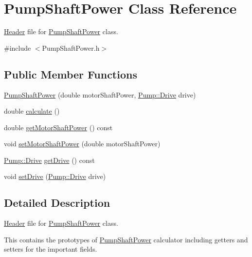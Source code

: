 \hypertarget{class_pump_shaft_power}{}\section{Pump\+Shaft\+Power Class Reference}
\label{class_pump_shaft_power}


\hyperlink{class_header}{Header} file for \hyperlink{class_pump_shaft_power}{Pump\+Shaft\+Power} class.  




{\ttfamily \#include $<$Pump\+Shaft\+Power.\+h$>$}

\subsection*{Public Member Functions}
\begin{DoxyCompactItemize}
\item 
\hyperlink{class_pump_shaft_power_a84d04978ce410d544a4c8d9eb393c92d}{Pump\+Shaft\+Power} (double motor\+Shaft\+Power, \hyperlink{class_pump_a32bf0ade131a11bb3b3fb374f638e983}{Pump\+::\+Drive} drive)
\item 
double \hyperlink{class_pump_shaft_power_aad32bf26469a5f2984c85ba07c3f84d9}{calculate} ()
\item 
double \hyperlink{class_pump_shaft_power_acb91eadb960f946ffee5373d4839a5be}{get\+Motor\+Shaft\+Power} () const
\item 
void \hyperlink{class_pump_shaft_power_a77b8c621c7c92841dbd00112437c413b}{set\+Motor\+Shaft\+Power} (double motor\+Shaft\+Power)
\item 
\hyperlink{class_pump_a32bf0ade131a11bb3b3fb374f638e983}{Pump\+::\+Drive} \hyperlink{class_pump_shaft_power_a3d6529d7f5ce8ef194af9abe5e6399b6}{get\+Drive} () const
\item 
void \hyperlink{class_pump_shaft_power_a2c35a110c65c582a6f7d1d4c714f8187}{set\+Drive} (\hyperlink{class_pump_a32bf0ade131a11bb3b3fb374f638e983}{Pump\+::\+Drive} drive)
\end{DoxyCompactItemize}


\subsection{Detailed Description}
\hyperlink{class_header}{Header} file for \hyperlink{class_pump_shaft_power}{Pump\+Shaft\+Power} class. 

This contains the prototypes of \hyperlink{class_pump_shaft_power}{Pump\+Shaft\+Power} calculator including getters and setters for the important fields.

